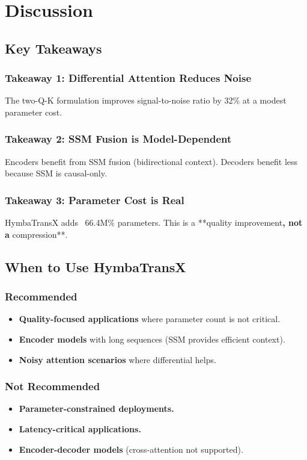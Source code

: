 \section{Discussion}

\subsection{Key Takeaways}

\subsubsection{Takeaway 1: Differential Attention Reduces Noise}

The two-Q-K formulation improves signal-to-noise ratio by 
32\% at a modest parameter cost.

\subsubsection{Takeaway 2: SSM Fusion is Model-Dependent}

Encoders benefit from SSM fusion (bidirectional context). Decoders benefit 
less because SSM is causal-only.

\subsubsection{Takeaway 3: Parameter Cost is Real}

HymbaTransX adds ~66.4M\% parameters. This is a **quality 
improvement\textbf{, not a }compression**.

\subsection{When to Use HymbaTransX}

\subsubsection{Recommended}
\begin{itemize}
\item \textbf{Quality-focused applications} where parameter count is not critical.
\item \textbf{Encoder models} with long sequences (SSM provides efficient context).
\item \textbf{Noisy attention scenarios} where differential helps.

\end{itemize}
\subsubsection{Not Recommended}
\begin{itemize}
\item \textbf{Parameter-constrained deployments.}
\item \textbf{Latency-critical applications.}
\item \textbf{Encoder-decoder models} (cross-attention not supported).

\end{itemize}
